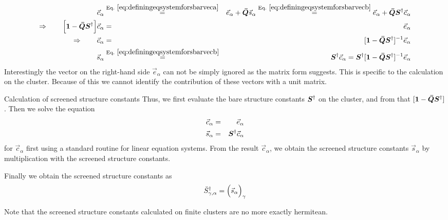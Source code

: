 \documentclass[11pt,a4paper]{report}
\begin{document}
\begin{eqnarray}
\vec{c}_\alpha
&\eqrel{eq:definingeqsystemforsbarveca}{=}&
\vec{e}_\alpha+\mat{\bar{Q}}\vec{s}_\alpha
\eqrel{eq:definingeqsystemforsbarvecb}{=}
\vec{e}_\alpha+\mat{\bar{Q}}\mat{S}^\dagger\vec{c}_\alpha
\nonumber\\
\Rightarrow\qquad
\Bigl[\mat{1}-\mat{\bar{Q}}\mat{S}^\dagger\Bigr]\vec{c}_\alpha&=&\vec{e}_\alpha
\nonumber\\
\Rightarrow\qquad
\vec{c}_\alpha&=&[\mat{1}-\mat{\bar{Q}}\mat{S}^\dagger]^{-1}\vec{e}_\alpha
\nonumber\\
\vec{s}_\alpha
&\eqrel{eq:definingeqsystemforsbarvecb}{=}&
\mat{S}^\dagger\vec{c}_\alpha
=\mat{S}^\dagger[\mat{1}-\mat{\bar{Q}}\mat{S}^\dagger]^{-1}\vec{e}_\alpha
\end{eqnarray}
Interestingly the vector on the right-hand side $\vec{e}_\alpha$ can
not be simply ignored as the matrix form suggests. This is specific to
the calculation on the cluster. Because of this we cannot identify the
contribution of these vectors with a unit matrix.



\begin{myshadowminipage}{Calculation of screened structure constants}
Thus, we first evaluate the bare structure constants $\bm{S}^\dagger$
on the cluster, and from that
$[\bm{1}-\bm{\bar{Q}}\bm{S}^\dagger]$. Then we solve the equation
\begin{eqnarray}
[\mat{1}-\mat{\bar{Q}}\mat{S}^\dagger]\vec{c}_\alpha&=&\vec{e}_\alpha
\label{eq:forscreenedsa}
\nonumber\\
\vec{s}_\alpha&=&\mat{S}^\dagger\vec{c}_\alpha
\label{eq:forscreenedsb}
\end{eqnarray}
for $\vec{c}_\alpha$ first using a standard routine for linear
equation systems. From the result $\vec{c}_\alpha$, we obtain the
screened structure constants $\vec{s}_\alpha$ by multiplication with
the screened structure constants.

Finally we obtain the screened structure constants as
\begin{eqnarray}
\bar{S}^\dagger_{\gamma,\alpha}=\Bigl(\vec{s}_\alpha\Bigr)_\gamma
\end{eqnarray}
\end{myshadowminipage}

Note that the screened structure constants calculated on finite
clusters are no more exactly hermitean.



\end{document}
